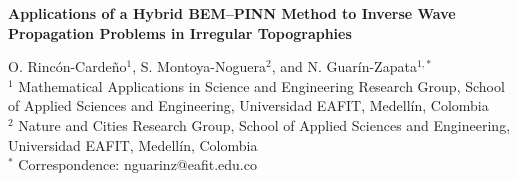\documentclass[11pt,twoside]{article}
\begin{document}

\thispagestyle{empty}

\vspace{-2mm}
\begin{minipage}{15.0cm}
    \begin{center}
        \textbf{\large Applications of a Hybrid BEM–PINN Method to Inverse Wave Propagation Problems in Irregular Topographies}
    \end{center}
\end{minipage}
\begin{minipage}{0.0cm}
    \begin{center}
    \end{center}
\end{minipage}
\vspace{-2mm}
\vspace{0.6cm}

{\footnotesize\noindent O. Rincón-Cardeño$^1$, S. Montoya-Noguera$^2$, and N. Guarín-Zapata$^{1,*}$ \\
$^1$ Mathematical Applications in Science and Engineering Research Group, School of Applied Sciences and Engineering, Universidad EAFIT,
  Medellín, Colombia \\
$^2$ Nature and Cities Research Group, School of Applied Sciences and Engineering, Universidad EAFIT, Medellín, Colombia\\
  $^*$ Correspondence: nguarinz@eafit.edu.co}
\end{document}
